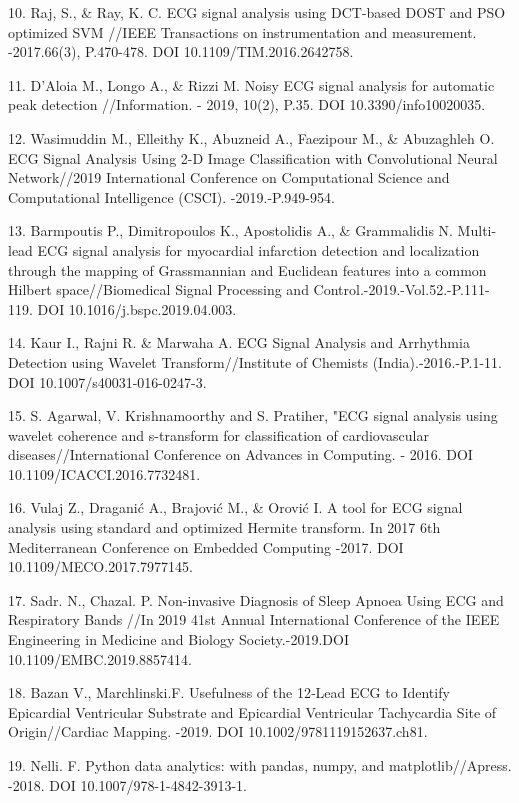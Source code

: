 \begin{refs}
10. Raj, S., \& Ray, K. C. ECG signal analysis using DCT-based DOST and
PSO optimized SVM //IEEE Transactions on instrumentation and
measurement. -2017.66(3), P.470-478. DOI 10.1109/TIM.2016.2642758.

11. D'Aloia M., Longo A., \& Rizzi M. Noisy ECG signal analysis for
automatic peak detection //Information. - 2019, 10(2), P.35. DOI
10.3390/info10020035.

12. Wasimuddin M., Elleithy K., Abuzneid A., Faezipour M., \& Abuzaghleh
O. ECG Signal Analysis Using 2-D Image Classification with Convolutional
Neural Network//2019 International Conference on Computational Science
and Computational Intelligence (CSCI). -2019.-P.949-954.

13. Barmpoutis P., Dimitropoulos K., Apostolidis A., \& Grammalidis N.
Multi-lead ECG signal analysis for myocardial infarction detection and
localization through the mapping of Grassmannian and Euclidean features
into a common Hilbert space//Biomedical Signal Processing and
Control.-2019.-Vol.52.-P.111-119. DOI 10.1016/j.bspc.2019.04.003.

14. Kaur I., Rajni R. \& Marwaha A. ECG Signal Analysis and Arrhythmia
Detection using Wavelet Transform//Institute of Chemists
(India).-2016.-P.1-11. DOI 10.1007/s40031-016-0247-3.

15. S. Agarwal, V. Krishnamoorthy and S. Pratiher, "ECG signal analysis
using wavelet coherence and s-transform for classification of
cardiovascular diseases//International Conference on Advances in
Computing. - 2016. DOI 10.1109/ICACCI.2016.7732481.

16. Vulaj Z., Draganić A., Brajović M., \& Orović I. A tool for ECG
signal analysis using standard and optimized Hermite transform. In 2017
6th Mediterranean Conference on Embedded Computing -2017. DOI
10.1109/MECO.2017.7977145.

17. Sadr. N., Chazal. P. Non-invasive Diagnosis of Sleep Apnoea Using ECG
and Respiratory Bands //In 2019 41st Annual International Conference of
the IEEE Engineering in Medicine and Biology Society.-2019.DOI
10.1109/EMBC.2019.8857414.

18. Bazan V., Marchlinski.F. Usefulness of the 12‐Lead ECG to Identify
Epicardial Ventricular Substrate and Epicardial Ventricular Tachycardia
Site of Origin//Cardiac Mapping. -2019. DOI 10.1002/9781119152637.ch81.

19. Nelli. F. Python data analytics: with pandas, numpy, and
matplotlib//Apress. -2018. DOI 10.1007/978-1-4842-3913-1.


\end{refs}

